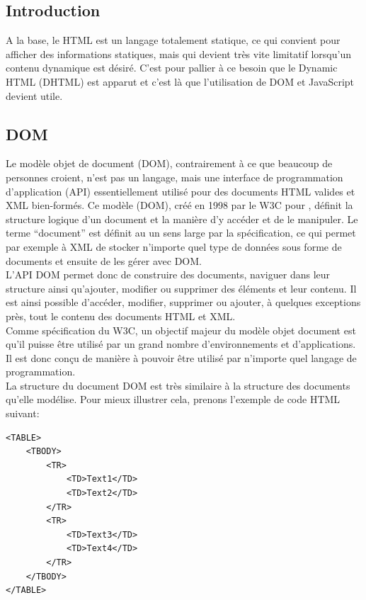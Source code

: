 \documentclass[10pt,a4paper,titlepage]{article}
\begin{document}
\subsection{Introduction}
A la base, le HTML est un langage totalement statique, ce qui convient pour afficher des informations statiques, mais qui devient très vite limitatif lorsqu'un contenu dynamique est désiré. C'est pour pallier à ce besoin que le Dynamic HTML (DHTML) est apparut et c'est là que l'utilisation de DOM et JavaScript devient utile.

\subsection{DOM}
Le modèle objet de document (DOM), contrairement à ce que beaucoup de personnes croient, n'est pas un langage, mais une interface de programmation d'application (API) essentiellement utilisé pour des documents HTML valides et XML bien-formés. Ce modèle (DOM), créé en 1998 par le W3C pour , définit la structure logique d'un document et la manière d'y accéder et de le manipuler. Le terme “document” est définit au un sens large par la spécification, ce qui permet par exemple à XML de stocker n'importe quel type de données sous forme de documents et ensuite de les gérer avec DOM.\\

L'API DOM permet donc de construire des documents, naviguer dans leur structure ainsi qu'ajouter, modifier ou supprimer des éléments et leur contenu. Il est ainsi possible d'accéder, modifier, supprimer ou ajouter, à quelques exceptions près, tout le contenu des documents HTML et XML.\\

Comme spécification du W3C, un objectif majeur du modèle objet document est qu'il puisse être utilisé par un grand nombre d'environnements et d'applications. Il est donc conçu de manière à pouvoir être utilisé par n'importe quel langage de programmation.\\

La structure du document DOM est très similaire à la structure des documents qu'elle modélise. Pour mieux illustrer cela, prenons l'exemple de code HTML suivant:

\begin{lstlisting}
<TABLE>
	<TBODY> 
		<TR> 
			<TD>Text1</TD>
			<TD>Text2</TD> 
		</TR> 
		<TR>
			<TD>Text3</TD>        
			<TD>Text4</TD> 
		</TR> 
	</TBODY>
</TABLE>
\end{lstlisting}
\end{document}
